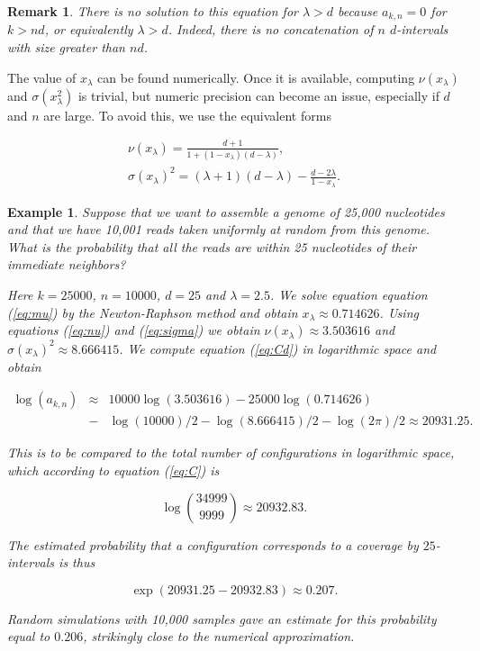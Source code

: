 \documentclass{article}
\newtheorem*{remark}{Remark}
\newtheorem{example}{Example}
\begin{document}
\begin{remark}
There is no solution to this equation for $\lambda > d$ because $a_{k,n} =
0$ for $k > nd$, or equivalently $\lambda > d$. Indeed, there is no
concatenation of $n$ $d$-intervals with size greater than $nd$.
\end{remark}


The value of $x_\lambda$ can be found numerically. Once it is available,
computing $\nu(x_\lambda)$ and $\sigma(x_\lambda^2)$ is trivial, but
numeric precision can become an issue, especially if $d$ and $n$ are
large. To avoid this, we use the equivalent forms

\begin{gather}
\nu(x_\lambda) = \frac{d+1}{1 +
  (1-x_\lambda)(d-\lambda)}, \label{eq:nu} \\
\sigma(x_\lambda)^2 = (\lambda+1)(d-\lambda) -
  \frac{d-2\lambda}{1-x_\lambda}. \label{eq:sigma}
\end{gather}


\begin{example}

Suppose that we want to assemble a genome of 25,000 nucleotides and that
we have 10,001 reads taken uniformly at random from this genome. What is
the probability that all the reads are within 25 nucleotides of their
immediate neighbors?

Here $k=25000$, $n=10000$, $d=25$ and $\lambda = 2.5$. We solve equation
equation (\ref{eq:mu}) by the Newton-Raphson method and obtain $x_\lambda
\approx 0.714626$. Using equations (\ref{eq:nu}) and (\ref{eq:sigma}) we
obtain $\nu(x_\lambda) \approx 3.503616$ and $\sigma(x_\lambda)^2 \approx
8.666415$. We compute equation (\ref{eq:Cd}) in logarithmic space and
obtain

\begin{eqnarray*}
\log(a_{k,n}) &\approx& 10000 \log(3.503616) - 25000 \log(0.714626) \\
&-& \log(10000)/2 - \log(8.666415)/2 - \log(2\pi)/2
\approx 20931.25.
\end{eqnarray*}

This is to be compared to the total number of configurations in
logarithmic space, which according to equation (\ref{eq:C}) is

\begin{equation*}
\log { 34999 \choose 9999 } \approx 20932.83.
\end{equation*}

The estimated probability that a configuration corresponds to a coverage
by $25$-intervals is
thus

\begin{equation*}
\exp(20931.25-20932.83) \approx 0.207.
\end{equation*}

Random simulations with 10,000 samples gave an estimate for this
probability equal to $0.206$, strikingly close to the numerical
approximation.

\end{example}
\end{document}
